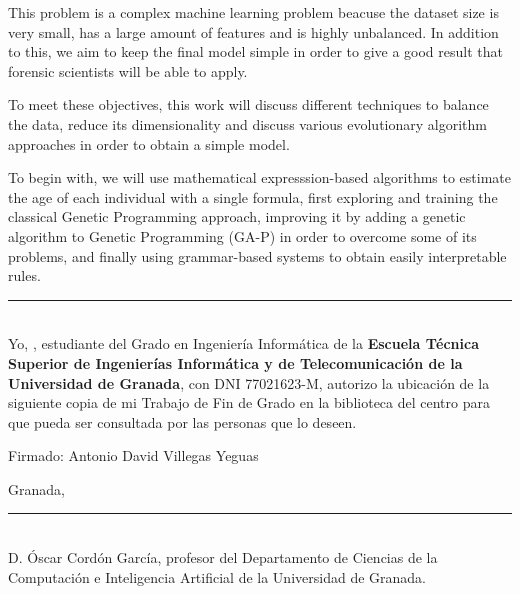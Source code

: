 This problem is a complex machine learning problem beacuse the dataset size is very small, has a large amount of features and is highly unbalanced. In addition to this, we aim to keep the final model simple in order to give a good result that forensic scientists will be able to apply.


To meet these objectives, this work will discuss different techniques to balance the data, reduce its dimensionality and discuss various evolutionary algorithm approaches in order to obtain a simple model.


To begin with, we will use mathematical expresssion-based algorithms to estimate the age of each individual with a single formula, first exploring and training the classical Genetic Programming approach, improving it by adding a genetic algorithm to Genetic Programming (GA-P) in order to overcome some of its problems, and finally using grammar-based systems to obtain easily interpretable rules.



\newpage

\vspace*{2cm}

\rule{\linewidth}{1 mm} \\[1 cm]

{\large Yo, \textbf{\theauthor}, estudiante del Grado en Ingeniería Informática de la \textbf{Escuela Técnica Superior de Ingenierías Informática y de Telecomunicación de la Universidad de Granada}, con DNI 77021623-M, autorizo la ubicación de la siguiente copia de mi Trabajo de Fin de Grado en la biblioteca del centro para que pueda ser consultada por las personas que lo deseen.}

\vspace{7cm}

Firmado: Antonio David Villegas Yeguas

\vspace{2cm}

Granada, \thedate



\newpage

\vspace*{2cm}

\rule{\linewidth}{1 mm} \\[1 cm]

D. Óscar Cordón García, profesor del Departamento de Ciencias de la Computación e Inteligencia Artificial de la Universidad de Granada.

\vspace{1cm}

